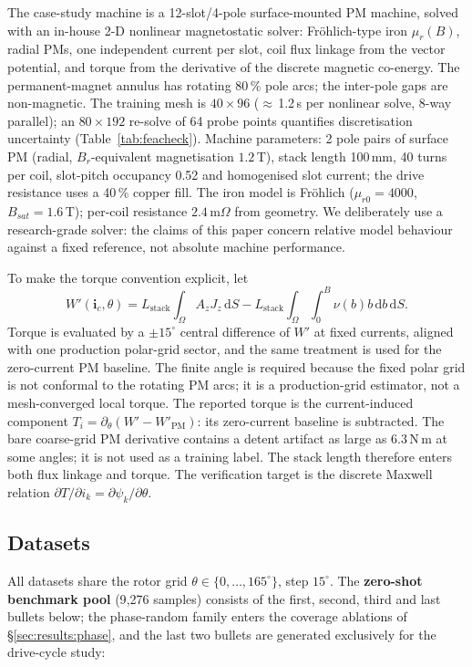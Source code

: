 \documentclass[review]{elsarticle}
\newcommand{\ic}{\boldsymbol{i}_c}
\begin{document}
The case-study machine is a 12-slot/4-pole surface-mounted PM machine,
solved with an
in-house 2-D nonlinear magnetostatic solver: Fr\"ohlich-type iron
$\mu_r(B)$, radial PMs, one independent current per slot, coil flux linkage
from the vector potential, and torque from the derivative of the discrete
magnetic co-energy. The permanent-magnet annulus has rotating 80\,\% pole
arcs; the inter-pole gaps are non-magnetic. The training mesh is
$40\times96$ ($\approx$\,1.2\,s per nonlinear solve, 8-way parallel); an
$80\times192$ re-solve of 64 probe points quantifies discretisation
uncertainty (Table~\ref{tab:feacheck}). Machine parameters: 2 pole pairs
of surface PM (radial, $B_r$-equivalent magnetisation
$1.2$\,T), stack length 100\,mm, 40 turns per coil, slot-pitch occupancy
0.52 and homogenised slot current; the drive resistance uses a 40\,\%
copper fill. The iron model is Fr\"ohlich ($\mu_{r0}=4000$,
$B_{sat}=1.6$\,T); per-coil resistance $2.4$\,m$\Omega$ from geometry.
We deliberately use a research-grade solver: the claims of this paper
concern relative model behaviour against a fixed reference, not absolute
machine performance.

To make the torque convention explicit, let
\begin{equation}
W'(\ic,\theta)
=L_{\mathrm{stack}}\int_\Omega A_zJ_z\,\mathrm dS
-L_{\mathrm{stack}}\int_\Omega
\int_0^{B}\nu(b)b\,\mathrm db\,\mathrm dS .
\end{equation}
Torque is evaluated by a $\pm15^\circ$ central difference of $W'$ at fixed
currents, aligned with one production polar-grid sector, and the same
treatment is used for the zero-current PM baseline.
The finite angle is required because the fixed polar grid is not conformal
to the rotating PM arcs; it is a production-grid estimator, not a
mesh-converged local torque.
The reported torque is the current-induced component
$T_i=\partial_\theta(W'-W'_{\mathrm{PM}})$: its zero-current baseline is
subtracted. The bare coarse-grid PM derivative contains a detent artifact
as large as $6.3$\,N\,m at some angles; it is not used as a training label.
The stack length therefore enters both flux linkage and torque. The
verification target is the discrete Maxwell relation
$\partial T/\partial i_k=\partial\psi_k/\partial\theta$.

\subsection{Datasets}

All datasets share the rotor grid $\theta\in\{0,\dots,165^\circ\}$, step
$15^\circ$. The \textbf{zero-shot benchmark pool} (9{,}276 samples) consists
of the first, second, third and last bullets below; the phase-random family
enters the coverage ablations of \S\ref{sec:results:phase}, and the last two
bullets are generated exclusively for the drive-cycle study:
\end{document}
